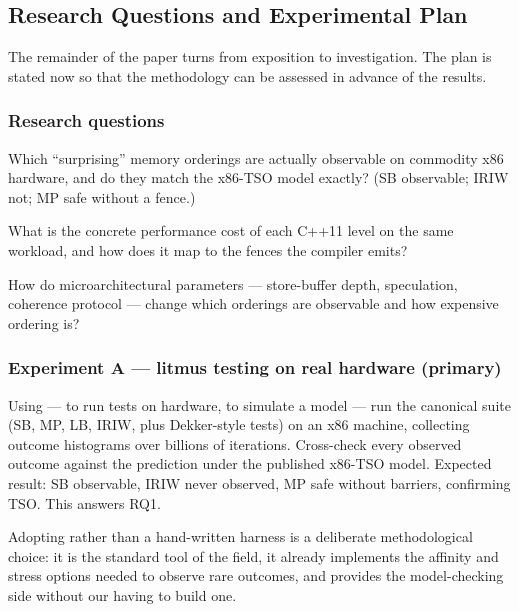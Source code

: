 \subsection{Research Questions and Experimental Plan}

The remainder of the paper turns from exposition to investigation.
The plan is stated now so that the methodology can be assessed in advance of
the results.

\subsubsection*{Research questions}

\begin{description}[leftmargin=1.6cm,style=nextline,font=\normalfont\bfseries]
\item[RQ1 Observation] Which ``surprising'' memory orderings are actually
  observable on commodity x86 hardware, and do they match the x86-TSO model
  exactly? (SB observable; IRIW not; MP safe without a fence.)
\item[RQ2 Cost] What is the concrete performance cost of each C++11
   level on the same workload, and how does it map to the
  fences the compiler emits?
\item[RQ3 Microarchitecture] How do microarchitectural parameters ---
  store-buffer depth, speculation, coherence protocol --- change which
  orderings are observable and how expensive ordering is?
\end{description}

\subsubsection*{Experiment A --- litmus testing on real hardware (primary)}

Using  ---  to run tests on hardware,
 to simulate a model --- run the canonical suite (SB, MP, LB, IRIW,
plus Dekker-style tests) on an x86 machine, collecting outcome histograms over
billions of iterations.
Cross-check every observed outcome against the  prediction under the
published x86-TSO  model.
Expected result: SB observable, IRIW never observed, MP safe without barriers,
confirming TSO.
This answers RQ1.

Adopting  rather than a hand-written harness is a deliberate
methodological choice: it is the standard tool of the field, it already
implements the affinity and stress options needed to observe rare outcomes, and
 provides the model-checking side without our having to build one.

